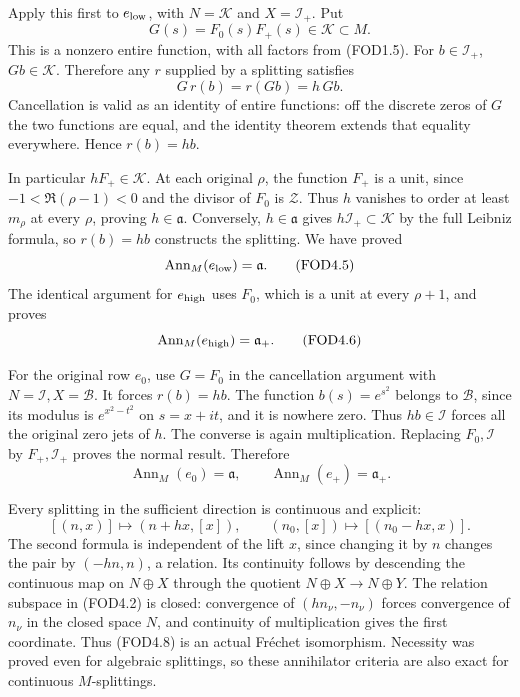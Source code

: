 Apply this first to \(e_{\rm low}\), with \(N=\mathcal K\) and
\(X=\mathcal I_+\). Put \[
G(s)=F_0(s)F_+(s)\in\mathcal K\subset M.
\tag{FOD4.3}
\] This is a nonzero entire function, with all factors from (FOD1.5).
For \(b\in\mathcal I_+\), \(Gb\in\mathcal K\). Therefore any \(r\)
supplied by a splitting satisfies \[
G\,r(b)=r(Gb)=h\,G b.
\tag{FOD4.4}
\] Cancellation is valid as an identity of entire functions: off the
discrete zeros of \(G\) the two functions are equal, and the identity
theorem extends that equality everywhere. Hence \(r(b)=hb\).

In particular \(hF_+\in\mathcal K\). At each original \(\rho\), the
function \(F_+\) is a unit, since \(-1<\Re(\rho-1)<0\) and the divisor
of \(F_0\) is \(\mathscr Z\). Thus \(h\) vanishes to order at least
\(m_\rho\) at every \(\rho\), proving \(h\in\mathfrak a\). Conversely,
\(h\in\mathfrak a\) gives \(h\mathcal I_+\subset\mathcal K\) by the full
Leibniz formula, so \(r(b)=hb\) constructs the splitting. We have proved
\[
\operatorname{Ann}_M(e_{\rm low})=\mathfrak a.
\tag{FOD4.5}
\] The identical argument for \(e_{\rm high}\) uses \(F_0\), which is a
unit at every \(\rho+1\), and proves \[
\operatorname{Ann}_M(e_{\rm high})=\mathfrak a_+.
\tag{FOD4.6}
\]

For the original row \(e_0\), use \(G=F_0\) in the cancellation argument
with \(N=\mathcal I,X=\mathcal B\). It forces \(r(b)=hb\). The function
\(b(s)=e^{s^2}\) belongs to \(\mathcal B\), since its modulus is
\(e^{x^2-t^2}\) on \(s=x+it\), and it is nowhere zero. Thus
\(hb\in\mathcal I\) forces all the original zero jets of \(h\). The
converse is again multiplication. Replacing \(F_0,\mathcal I\) by
\(F_+,\mathcal I_+\) proves the normal result. Therefore \[
\operatorname{Ann}_M(e_0)=\mathfrak a,\qquad
\operatorname{Ann}_M(e_+)=\mathfrak a_+.
\tag{FOD4.7}
\]

Every splitting in the sufficient direction is continuous and explicit:
\[
[(n,x)]\longmapsto(n+hx,[x]),\qquad
(n_0,[x])\longmapsto[(n_0-hx,x)].
\tag{FOD4.8}
\] The second formula is independent of the lift \(x\), since changing
it by \(n\) changes the pair by \((-hn,n)\), a relation. Its continuity
follows by descending the continuous map on \(N\oplus X\) through the
quotient \(N\oplus X\to N\oplus Y\). The relation subspace in (FOD4.2)
is closed: convergence of \((hn_\nu,-n_\nu)\) forces convergence of
\(n_\nu\) in the closed space \(N\), and continuity of multiplication
gives the first coordinate. Thus (FOD4.8) is an actual Fréchet
isomorphism. Necessity was proved even for algebraic splittings, so
these annihilator criteria are also exact for continuous
\(M\)-splittings.

